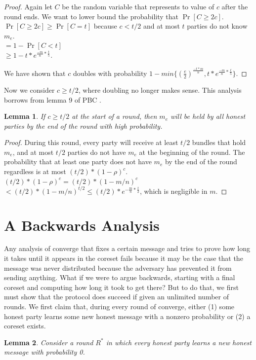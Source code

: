 \documentclass{article}
\newtheorem{lemma}{Lemma}
\begin{document}
\begin{proof}
Again let $C$ be the random variable that represents to value of $c$ after the round ends. We want to lower bound the probability that $\Pr[C \geq 2c]$.\\
$\Pr[C \geq 2c] \geq \Pr[C = t]$ because $c < t/2$ and at most $t$ parties do not know $m_e$.\\
$= 1 - \Pr[C < t]$\\
$\geq 1 - t*e^{\frac{-m}{n} * \frac{t}{5}}$.

We have shown that $c$ doubles with probability $1 - min\{(\frac{e}{2})^{\frac{-t*m}n} , t*e^{\frac{-m}{n} * \frac{t}{5}}\}$.
\end{proof}

Now we consider $c \geq t/2$, where doubling no longer makes sense. This analysis borrows from lemma 9 of PBC \cite{PBC}.
\begin{lemma}
If $c \geq t/2$ at the start of a round, then $m_e$ will be held by all honest parties by the end of the round with high probability.
\end{lemma}
\begin{proof}
During this round, every party will receive at least $t/2$ bundles that hold $m_e$, and at most $t/2$ parties do not have $m_e$ at the beginning of the round. The probability that at least one party does not have $m_e$ by the end of the round regardless is at most $(t/2) * (1 - \rho)^c$.\\
 $(t/2) * (1 - \rho)^c = (t/2) * (1 - m/n)^c$\\
 $< (t/2) * (1 - m/n)^{t/2} \leq (t/2) * e^{-\frac m n * \frac t 2}$, which is negligible in $m$.
\end{proof}

\section{A Backwards Analysis}
Any analysis of converge that fixes a certain message and tries to prove how long it takes until it appears in the coreset fails because it may be the case that the message was never distributed because the adversary has prevented it from sending anything. What if we were to argue backwards, starting with a final coreset and computing how long it took to get there? But to do that, we first must show that the protocol does succeed if given an unlimited number of rounds. We first claim that, during every round of converge, either (1) some honest party learns some new honest message with a nonzero probability or (2) a coreset exists.

\begin{lemma}
Consider a round $R^*$ in which every honest party learns a new honest message with probability 0.
\end{lemma}
\end{document}
